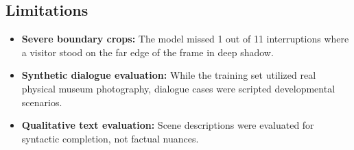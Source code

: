 ﻿\documentclass[11pt,a4paper]{article}
\begin{document}
\subsection{Limitations}
\begin{itemize}
    \item \textbf{Severe boundary crops:} The model missed 1 out of 11 interruptions where a visitor stood on the far edge of the frame in deep shadow.
    \item \textbf{Synthetic dialogue evaluation:} While the training set utilized real physical museum photography, dialogue cases were scripted developmental scenarios.
    \item \textbf{Qualitative text evaluation:} Scene descriptions were evaluated for syntactic completion, not factual nuances.
\end{itemize}
\end{document}
